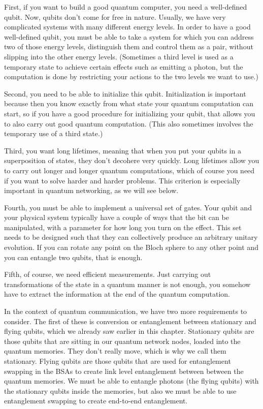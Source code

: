 First, if you want to build a good quantum computer, you need a well-defined qubit. Now, qubits don't come for free in nature. Usually, we have very complicated systems with many different energy levels. In order to have a good well-defined qubit, you must be able to take a system for which you can address two of those energy levels, distinguish them and control them as a pair, without slipping into the other energy levels.  (Sometimes a third level is used as a temporary state to achieve certain effects such as emitting a photon, but the computation is done by restricting your actions to the two levels we want to use.)

Second, you need to be able to initialize this qubit. Initialization is important because then you know exactly from what state your quantum computation can start, so if you have a good procedure for initializing your qubit, that allows you to also carry out good quantum computation.  (This also sometimes involves the temporary use of a third state.)

Third, you want long lifetimes, meaning that when you put your qubits in a superposition of states, they don't decohere very quickly. Long lifetimes allow you to carry out longer and longer quantum computations, which of course you need if you want to solve harder and harder problems.  This criterion is especially important in quantum networking, as we will see below.

Fourth, you must be able to implement a universal set of gates. Your qubit and your physical system typically have a couple of ways that the bit can be manipulated, with a parameter for how long you turn on the effect.  This set needs to be designed such that they can collectively produce an arbitrary unitary evolution. If you can rotate any point on the Bloch sphere to any other point and you can entangle two qubits, that is enough.

Fifth, of course, we need efficient measurements. Just carrying out transformations of the state in a quantum manner is not enough, you somehow have to extract the information at the end of the quantum computation.

In the context of quantum communication, we have two more requirements to consider. The first of these is conversion or entanglement between stationary and flying qubits, which we already saw earlier in this chapter. Stationary qubits are those qubits that are sitting in our quantum network nodes, loaded into the quantum memories. They don't really move, which is why we call them stationary. Flying qubits are those qubits that are used for entanglement swapping in the BSAs to create link level entanglement between between the quantum memories. We must be able to entangle photons (the flying qubits) with the stationary qubits inside the memories, but also we must be able to use entanglement swapping to create end-to-end entanglement.

